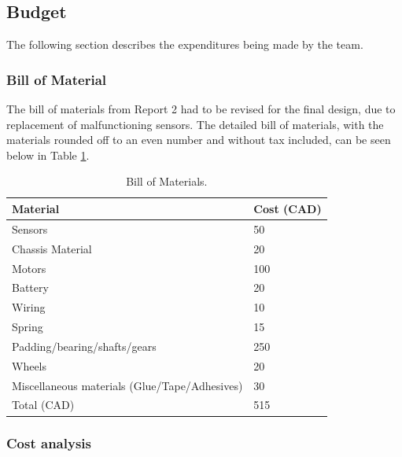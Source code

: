 \documentclass[ece]{uw-wkrpt}
\begin{document}
\subsection{Budget}

The following section describes the expenditures being made by the team.

\subsubsection{Bill of Material}

The bill of materials from Report 2 had to be revised for the final design, due to replacement of malfunctioning sensors. The detailed bill of materials, with the materials rounded off to an even number and without tax included, can be seen below in Table \ref{tab:billOfMaterials}.

\begin{table}[!htb]
  \centering
    \caption[Bill of Materials]
    {Bill of Materials.}
    \begin{tabular}{ | l | l | }
        \hline
        Material  & \cellcolor{mygray}Cost (CAD)  \\ \hline 
        \cellcolor{mygray} Sensors  & 50 \\ \hline
        \cellcolor{mygray} Chassis Material  & 20 \\ \hline
        \cellcolor{mygray} Motors  & 100 \\ \hline
        \cellcolor{mygray} Battery  & 20 \\ \hline
        \cellcolor{mygray} Wiring  & 10 \\ \hline
        \cellcolor{mygray} Spring  & 15 \\ \hline
        \cellcolor{mygray} Padding/bearing/shafts/gears  & 250 \\ \hline
        \cellcolor{mygray} Wheels  & 20 \\ \hline
        \cellcolor{mygray} Miscellaneous materials (Glue/Tape/Adhesives)  & 30 \\ \hline
        \cellcolor{mygray} Total (CAD)  & 515 \\ \hline
  \end{tabular}
  \label{tab:billOfMaterials}
\end{table}

\subsubsection{Cost analysis}
\end{document}
